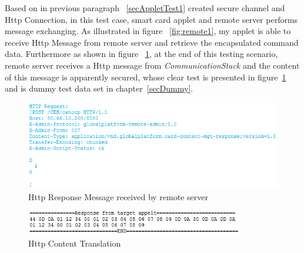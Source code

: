 Based on in previous paragraph ~\ref{secAppletTest1} created secure channel and Http Connection, in this test case, smart card applet and remote server performs message exchanging. As illustrated in figure ~\ref{fig:remote1}, my applet is able to receive Http Message from remote server and retrieve the encapsulated command data. Furthermore as shown in figure ~\ref{fig:remote2}, at the end of this testing scenario, remote server receives a Http message from \emph{CommunicationStack} and the content of this message is apparently secured, whose clear test is presented in figure~\ref{fig:remote2} and is dummy test data set in chapter~\ref{secDummy}.

\begin{figure}[!htb]
	\centering
	\includegraphics[width=1\textwidth]{Images/impl/http-msg.png}
		\caption{Http Response Message received by remote server}
	\label{fig:remote2}
\end{figure}

\begin{figure}[!htb]
	\centering
	\includegraphics[width=0.85\textwidth]{Images/impl/translate.png}
		\caption{Http Content Translation}
	\label{fig:remote3}
\end{figure}

